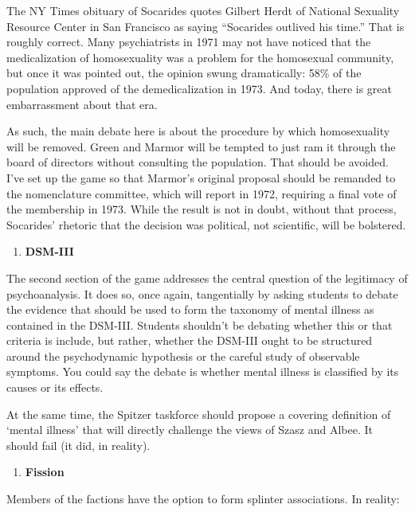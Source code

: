 The NY Times obituary of Socarides quotes Gilbert Herdt of National Sexuality Resource Center in San Francisco as saying ``Socarides outlived his time.'' That is roughly correct. Many psychiatrists in 1971 may not have noticed that the medicalization of homosexuality was a problem for the homosexual community, but once it was pointed out, the opinion swung dramatically: 58\% of the population approved of the demedicalization in 1973. And today, there is great embarrassment about that era. 

As such, the main debate here is about the procedure by which homosexuality will be removed. Green and Marmor will be tempted to just ram it through the board of directors without consulting the population. That should be avoided. I've set up the game so that Marmor's original proposal should be remanded to the nomenclature committee, which will report in 1972, requiring a final vote of the membership in 1973. While the result is not in doubt, without that process, Socarides' rhetoric that the decision was political, not scientific, will be bolstered.

\begin{enumerate}
\item \textbf{DSM-III}

\end{enumerate}

The second section of the game addresses the central question of the legitimacy of psychoanalysis. It does so, once again, tangentially by asking students to debate the evidence that should be used to form the taxonomy of mental illness as contained in the DSM-III. Students shouldn't be debating whether this or that criteria is include, but rather, whether the DSM-III ought to be structured around the psychodynamic hypothesis or the careful study of observable symptoms. You could say the debate is whether mental illness is classified by its causes or its effects.

At the same time, the Spitzer taskforce should propose a covering definition of `mental illness' that will directly challenge the views of Szasz and Albee. It should fail (it did, in reality). 

\begin{enumerate}
\item \textbf{Fission}

\end{enumerate}

Members of the factions have the option to form splinter associations. In reality:

